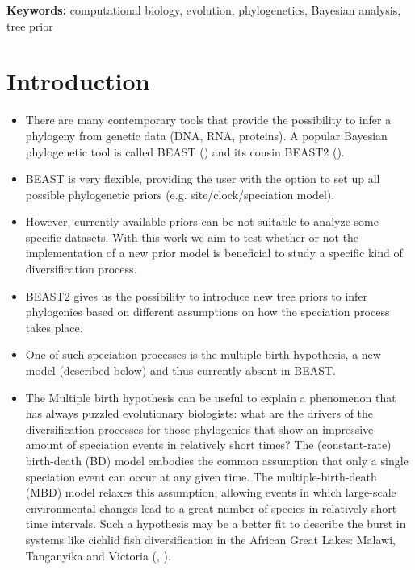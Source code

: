 {\bf Keywords:} computational biology, evolution, phylogenetics, Bayesian analysis, tree prior

\section{Introduction}
\begin{itemize}

\item There are many contemporary tools that provide the possibility 
to infer a phylogeny from genetic data (DNA, RNA, proteins). 
A popular Bayesian phylogenetic tool is called BEAST (\cite{beast}) 
and its cousin BEAST2 (\cite{beast2}).

\item BEAST is very flexible, providing the user with the option 
to set up all possible phylogenetic priors (e.g. site/clock/speciation model).

\item However, currently available priors can be not suitable 
to analyze some specific datasets. 
With this work we aim to test whether or not 
the implementation of a new prior model 
is beneficial to study a specific kind of diversification process.

\item BEAST2 gives us the possibility to introduce new tree priors 
to infer phylogenies based on different assumptions 
on how the speciation process takes place.

\item One of such speciation processes is the multiple birth hypothesis,
a new model (described below) and thus currently absent in BEAST.

\item The Multiple birth hypothesis can be useful to explain a phenomenon 
that has always puzzled evolutionary biologists: 
what are the drivers of the diversification processes 
for those phylogenies that show an impressive amount of speciation events 
in relatively short times? 
The (constant-rate) birth-death (BD) model embodies the common assumption that 
only a single speciation event can occur at any given time.
The multiple-birth-death (MBD) model 
relaxes this assumption, allowing events in which 
large-scale environmental changes lead to a great number of species 
in relatively short time intervals. 
Such a hypothesis may be a better fit to describe the burst in systems 
like cichlid fish diversification in the 
African Great Lakes: Malawi, Tanganyika and Victoria 
(\cite{janzen2016}, \cite{janzen2017}).


\end{itemize}
